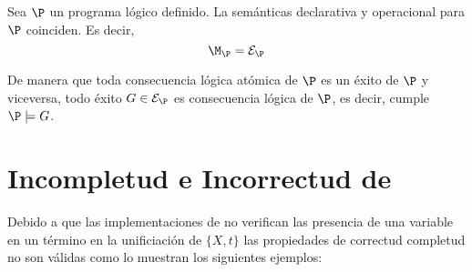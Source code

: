 \documentclass[11pt,letterpaper]{article}
\begin{document}
\begin{proposition}
Sea $\P$  un programa l\'ogico definido. La sem\'anticas declarativa y 
operacional para $\P$ coinciden. Es decir,
\[
\M_\P = \mathcal{E}_\P
\]
\end{proposition}

De manera que toda consecuencia l\'ogica at\'omica de $\P$ es un \'exito de 
$\P$ y viceversa, todo \'exito $G\in\mathcal{E}_\P$ es consecuencia l\'ogica de 
$\P$, es decir, cumple $\P\models G$.











\section{Incompletud e Incorrectud de {\pl}}

Debido a que las implementaciones de {\pl} no verifican las presencia de 
una variable en un t\'ermino en la unificiaci\'on de $\{X,t\}$ las propiedades 
de correctud completud no son v\'alidas como lo muestran los siguientes 
ejemplos:
\end{document}
